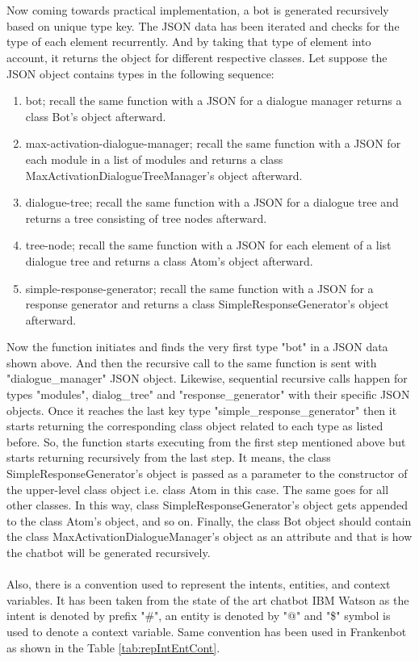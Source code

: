 \\~\\
Now coming towards practical implementation, a bot is generated recursively based on unique type key. The JSON data has been iterated and checks for the type of each element recurrently. And by taking that type of element into account, it returns the object for different respective classes. Let suppose the JSON object contains types in the following sequence:
\begin{enumerate}
    \item bot; recall the same function with a JSON for a dialogue manager returns a class Bot's object afterward.
    \item max-activation-dialogue-manager; recall the same function with a JSON for each module in a list of modules and returns a class MaxActivationDialogueTreeManager's object afterward.
    \item dialogue-tree; recall the same function with a JSON for a dialogue tree and returns a tree consisting of tree nodes afterward.
     \item tree-node; recall the same function with a JSON for each element of a list dialogue tree and returns a class Atom's object afterward.
     \item simple-response-generator; recall the same function with a JSON for a response generator and returns a class SimpleResponseGenerator's object afterward.
\end{enumerate} 
Now the function initiates and finds the very first type "bot" in a JSON data shown above. And then the recursive call to the same function is sent with "dialogue\_manager" JSON object. Likewise, sequential recursive calls happen for types "modules", dialog\_tree" and "response\_generator" with their specific JSON objects. Once it reaches the last key type "simple\_response\_generator" then it starts returning the corresponding class object related to each type as listed before. So, the function starts executing from the first step mentioned above but starts returning recursively from the last step. It means, the class SimpleResponseGenerator's object is passed as a parameter to the constructor of the upper-level class object i.e. class Atom in this case. The same goes for all other classes. In this way, class SimpleResponseGenerator's object gets appended to the class Atom's object, and so on. Finally, the class Bot object should contain the class MaxActivationDialogueManager's object as an attribute and that is how the chatbot will be generated recursively.
\\~\\
Also, there is a convention used to represent the intents, entities, and context variables. It has been taken from the state of the art chatbot IBM Watson as the intent is denoted by prefix "\#", an entity is denoted by "@" and "\$" symbol is used to denote a context variable. Same convention has been used in Frankenbot as shown in the Table \ref{tab:repIntEntCont}.

